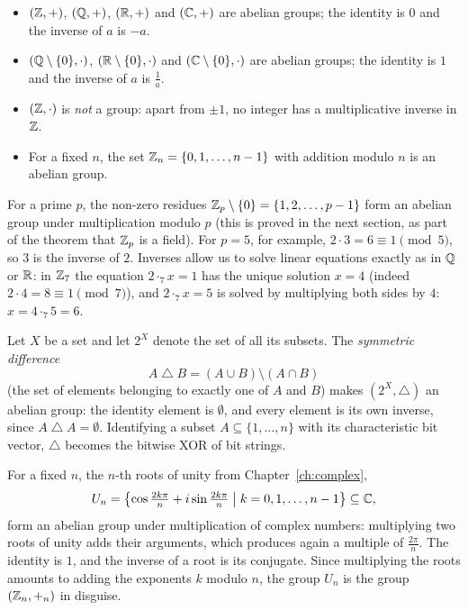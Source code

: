 \begin{example}
\hfill
\begin{itemize}
\item $(\mathbb{Z},+)$, $(\mathbb{Q},+)$, $(\mathbb{R},+)$ and $(\mathbb{C},+)$ are abelian groups; the identity is $0$ and the inverse of
$a$ is $-a$.
\item $(\mathbb{Q}\setminus\{0\},\cdot)$, $(\mathbb{R}\setminus\{0\},\cdot)$ and $(\mathbb{C}\setminus\{0\},\cdot)$ are abelian
groups; the identity is $1$ and the inverse of $a$ is $\tfrac{1}{a}$.
\item $(\mathbb{Z},\cdot)$ is \emph{not} a group: apart from $\pm 1$, no integer has a multiplicative inverse in
$\mathbb{Z}$.
\item For a fixed $n$, the set $\mathbb{Z}_n=\{0,1,\ldots,n-1\}$ with addition modulo $n$ is an abelian group.
\end{itemize}
\end{example}

\begin{example}
For a prime $p$, the non-zero residues $\mathbb{Z}_p\setminus\{0\}=\{1,2,\ldots,p-1\}$ form an abelian group under
multiplication modulo $p$ (this is proved in the next section, as part of the theorem that $\mathbb{Z}_p$ is a
field). For $p=5$, for example, $2\cdot 3 = 6 \equiv 1 \pmod 5$, so $3$ is the inverse of
$2$. Inverses allow us to solve linear equations exactly as in $\mathbb{Q}$ or $\mathbb{R}$: in $\mathbb{Z}_7$ the equation
$2\cdot_7 x = 1$ has the unique solution $x = 4$ (indeed $2\cdot 4 = 8 \equiv 1 \pmod 7$), and
$2 \cdot_7 x = 5$ is solved by multiplying both sides by $4$: $x = 4\cdot_7 5 = 6$.
\end{example}

\begin{example}
Let $X$ be a set and let $2^X$ denote the set of all its subsets. The \emph{symmetric difference}
\[
A \bigtriangleup B = (A\cup B)\setminus (A\cap B)
\]
(the set of elements belonging to exactly one of $A$ and $B$) makes $(2^X,\bigtriangleup)$ an abelian
group: the identity element is $\emptyset$, and every element is its own inverse, since
$A \bigtriangleup A = \emptyset$. Identifying a subset $A\subseteq \{1,\ldots,n\}$ with its characteristic
bit vector, $\bigtriangleup$ becomes the bitwise XOR of bit strings.
\end{example}

\begin{example}
For a fixed $n$, the $n$-th roots of unity from Chapter~\ref{ch:complex},
\[
U_n = \left\{\cos\tfrac{2k\pi}{n} + i \sin\tfrac{2k\pi}{n} \;\middle|\; k = 0,1,\ldots,n-1\right\}\subseteq\mathbb{C},
\]
form an abelian group under multiplication of complex numbers: multiplying two roots of unity adds their
arguments, which produces again a multiple of $\tfrac{2\pi}{n}$. The identity is $1$, and the inverse of a
root is its conjugate. Since multiplying the roots amounts to adding the exponents $k$ modulo $n$, the
group $U_n$ is the group $(\mathbb{Z}_n,+_n)$ in disguise.
\end{example}

